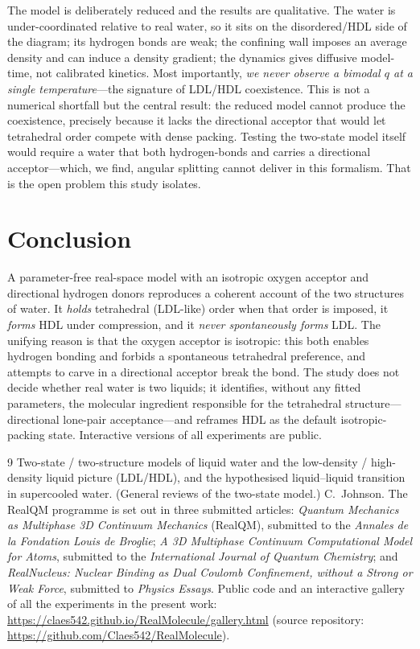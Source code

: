 \documentclass[11pt]{article}
\begin{document}
The model is deliberately reduced and the results are qualitative. The water is
under-coordinated relative to real water, so it sits on the disordered/HDL side of the
diagram; its hydrogen bonds are weak; the confining wall imposes an average density and can
induce a density gradient; the dynamics gives diffusive model-time, not calibrated kinetics.
Most importantly, \emph{we never observe a bimodal $q$ at a single temperature}---the
signature of LDL/HDL coexistence. This is not a numerical shortfall but the central result:
the reduced model cannot produce the coexistence, precisely because it lacks the directional
acceptor that would let tetrahedral order compete with dense packing. Testing the two-state
model itself would require a water that both hydrogen-bonds and carries a directional
acceptor---which, we find, angular splitting cannot deliver in this formalism. That is the
open problem this study isolates.

\section{Conclusion}

A parameter-free real-space model with an isotropic oxygen acceptor and directional hydrogen
donors reproduces a coherent account of the two structures of water. It \emph{holds}
tetrahedral (LDL-like) order when that order is imposed, it \emph{forms} HDL under
compression, and it \emph{never spontaneously forms} LDL. The unifying reason is that the
oxygen acceptor is isotropic: this both enables hydrogen bonding and forbids a spontaneous
tetrahedral preference, and attempts to carve in a directional acceptor break the bond. The
study does not decide whether real water is two liquids; it identifies, without any fitted
parameters, the molecular ingredient responsible for the tetrahedral structure---directional
lone-pair acceptance---and reframes HDL as the default isotropic-packing state. Interactive
versions of all experiments are public.

\begin{thebibliography}{9}
 Two-state / two-structure models of liquid water and the low-density /
high-density liquid picture (LDL/HDL), and the hypothesised liquid--liquid transition in
supercooled water. (General reviews of the two-state model.)
 C.\ Johnson. The RealQM programme is set out in three submitted articles:
\emph{Quantum Mechanics as Multiphase 3D Continuum Mechanics} (RealQM), submitted to the
\emph{Annales de la Fondation Louis de Broglie}; \emph{A 3D Multiphase Continuum Computational
Model for Atoms}, submitted to the \emph{International Journal of Quantum Chemistry}; and
\emph{RealNucleus: Nuclear Binding as Dual Coulomb Confinement, without a Strong or Weak Force},
submitted to \emph{Physics Essays}. Public code and an interactive gallery of all the
experiments in the present work:
\url{https://claes542.github.io/RealMolecule/gallery.html} (source repository:
\url{https://github.com/Claes542/RealMolecule}).
\end{thebibliography}
\end{document}
